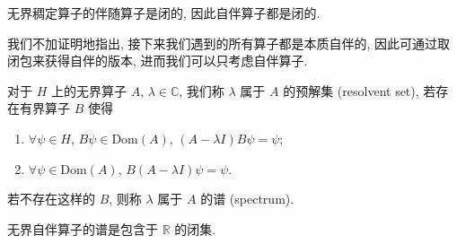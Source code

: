 \begin{proposition}
    无界稠定算子的伴随算子是闭的, 因此自伴算子都是闭的.
\end{proposition}

我们不加证明地指出, 接下来我们遇到的所有算子都是本质自伴的, 因此可通过取闭包来获得自伴的版本, 进而我们可以只考虑自伴算子.

\begin{definition}[谱]
    对于 $ H $ 上的无界算子 $ A $, $ \lambda\in\mathbb{C} $, 我们称 $ \lambda $ 属于 $ A $ 的预解集 (resolvent set), 若存在有界算子 $ B $ 使得
    \begin{enumerate}
        \item $ \forall\psi\in H $, $ B\psi\in\mathrm{Dom}(A) $, $ (A-\lambda I)B\psi=\psi $;
        \item $ \forall\psi\in\mathrm{Dom}(A) $, $ B(A-\lambda I)\psi=\psi $.
    \end{enumerate}
    若不存在这样的 $ B $, 则称 $ \lambda $ 属于 $ A $ 的谱 (spectrum).
\end{definition}

\begin{proposition}
    无界自伴算子的谱是包含于 $ \mathbb{R} $ 的闭集.
\end{proposition}